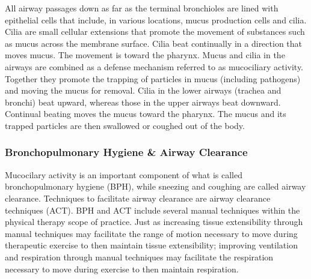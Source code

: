 All airway passages down as far as the terminal bronchioles are lined with epithelial cells that include, in various locations, mucus production cells and cilia. Cilia are small cellular extensions that promote the movement of substances such as mucus across the membrane surface. Cilia beat continually in a direction that moves mucus. The movement is toward the pharynx. Mucus and cilia in the airways are combined as a defense mechanism referred to as mucociliary activity. Together they promote the trapping of particles in mucus (including pathogens) and moving the mucus for removal. Cilia in the lower airways (trachea and bronchi) beat upward, whereas those in the upper airways beat downward. Continual beating moves the mucus toward the pharynx. The mucus and its trapped particles are then swallowed or coughed out of the body.

\subsubsection{Bronchopulmonary Hygiene \& Airway Clearance}
Mucocilary activity is an important component of what is called bronchopulmonary hygiene (BPH), while sneezing and coughing are called airway clearance. Techniques to facilitate airway clearance are airway clearance techniques (ACT). BPH and ACT include several manual techniques within the physical therapy scope of practice.\footnotemark{} Just as increasing tissue extensibility through manual techniques may facilitate the range of motion necessary to move during therapeutic exercise to then maintain tissue extensibility; improving ventilation and respiration through manual techniques may facilitate the respiration necessary to move during exercise to then maintain respiration.  

